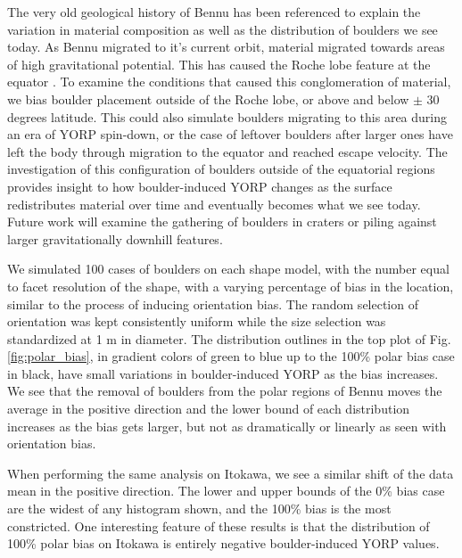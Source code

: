 The very old geological history of Bennu has been referenced to explain the variation in material composition as well as the distribution of boulders we see today. As Bennu migrated to it's current orbit, material migrated towards areas of high gravitational potential. This has caused the Roche lobe feature at the equator \citep{Scheeres2019}. To examine the conditions that caused this conglomeration of material, we bias boulder placement outside of the Roche lobe, or above and below $\pm$ 30 degrees latitude. This could also simulate boulders migrating to this area during an era of YORP spin-down, or the case of leftover boulders after larger ones have left the body through migration to the equator and reached escape velocity. The investigation of this configuration of boulders outside of the equatorial regions provides insight to how boulder-induced YORP changes as the surface redistributes material over time and eventually becomes what we see today. Future work will examine the gathering of boulders in craters or piling against larger gravitationally downhill features.

We simulated 100 cases of boulders on each shape model, with the number equal to facet resolution of the shape, with a varying percentage of bias in the location, similar to the process of inducing orientation bias. The random selection of orientation was kept consistently uniform while the size selection was standardized at 1 m in diameter. The distribution outlines in the top plot of Fig.\ref{fig:polar_bias}, in gradient colors of green to blue up to the 100\% polar bias case in black, have small variations in boulder-induced YORP as the bias increases. We see that the removal of boulders from the polar regions of Bennu moves the average in the positive direction and the lower bound of each distribution increases as the bias gets larger, but not as dramatically or linearly as seen with orientation bias. 

When performing the same analysis on Itokawa, we see a similar shift of the data mean in the positive direction. The lower and upper bounds of the 0\% bias case are the widest of any histogram shown, and the 100\% bias is the most constricted. One interesting feature of these results is that the distribution of 100\% polar bias on Itokawa is entirely negative boulder-induced YORP values. 


